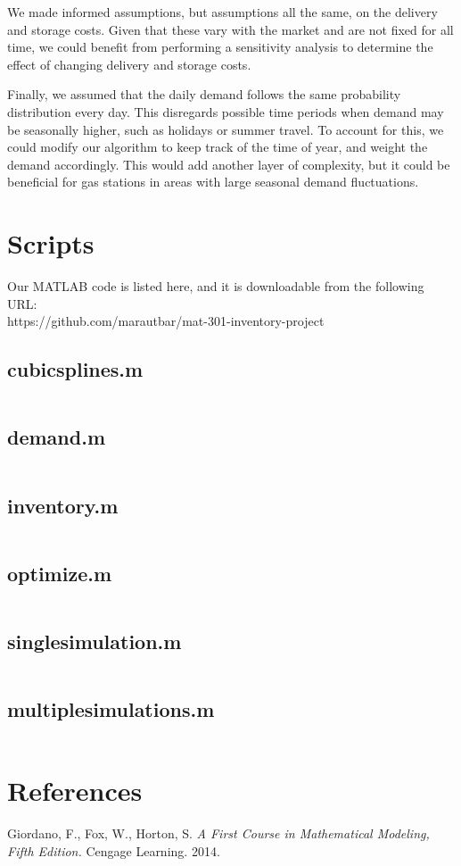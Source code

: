\documentclass{article}
\begin{document}
    We made informed assumptions, but assumptions all the same, on the delivery and storage costs. Given that these vary with the market and are not fixed for all time, we could benefit from performing a sensitivity analysis to determine the effect of changing delivery and storage costs.

    Finally, we assumed that the daily demand follows the same probability distribution every day. This disregards possible time periods when demand may be seasonally higher, such as holidays or summer travel. To account for this, we could modify our algorithm to keep track of the time of year, and weight the demand accordingly. This would add another layer of complexity, but it could be beneficial for gas stations in areas with large seasonal demand fluctuations.
    \pagebreak
    \section*{Scripts}
    Our MATLAB code is listed here, and it is downloadable from the following URL:\\
    https://github.com/marautbar/mat-301-inventory-project
    \subsection*{cubicsplines.m}
    \label{code:cubicsplines}
    \inputminted[linenos,breaklines]{matlab}{matlab/cubicsplines.m}
    \subsection*{demand.m}
    \label{code:demand}
    \inputminted[linenos,breaklines]{matlab}{matlab/demand.m}
    \subsection*{inventory.m}
    \label{code:inventory}
    \inputminted[linenos,breaklines]{matlab}{matlab/inventory.m}
    \subsection*{optimize.m}
    \label{code:optimize}
    \inputminted[linenos,breaklines]{matlab}{matlab/optimize.m}
    \subsection*{singlesimulation.m}
    \label{code:singlesimulation}
    \inputminted[linenos,breaklines]{matlab}{matlab/singlesimulation.m}
    \subsection*{multiplesimulations.m}
    \label{code:multiplesimulations}
    \inputminted[linenos,breaklines]{matlab}{matlab/multiplesimulations.m}
    \pagebreak
    \section*{References}
    Giordano, F., Fox, W., Horton, S. \emph{A First Course in Mathematical Modeling, Fifth Edition.} Cengage Learning. 2014.
\end{document}
